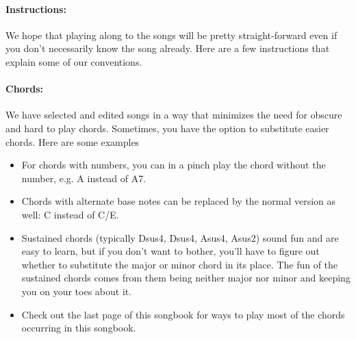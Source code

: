 \paragraph{Instructions: } We hope that playing along to the songs will be 
pretty straight-forward even if you don't necessarily know the song already. 
Here are a few instructions that explain some of our conventions.

\paragraph{Chords: } We have selected and edited songs in a way that 
minimizes the need for obscure and hard to play chords. Sometimes, you have 
the option to substitute easier chords. Here are some examples
\begin{itemize}
\item For chords with numbers, you can in a pinch play the chord without the 
number, e.g. A instead of A7.
\item Chords with alternate base notes can be replaced by the normal version 
as well: C instead of C/E.
\item Sustained chords (typically Dsus4, Dsus4, Asus4, Asus2) sound fun and 
are easy to learn, but if you don't want to bother, you'll have to figure out 
whether to substitute the major or minor chord in its place. The fun of 
the sustained chords comes from them being neither major nor minor and keeping 
you on your toes about it.
\item Check out the last page of this songbook for ways to play most of the 
chords occurring in this songbook.
\end{itemize}
